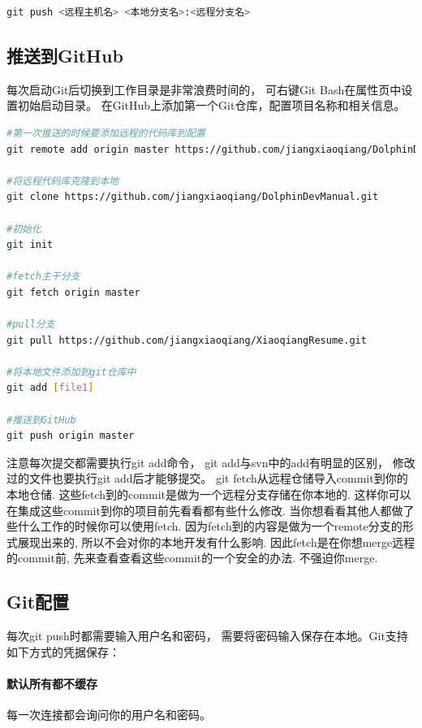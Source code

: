 \documentclass{book}
\begin{document}
\begin{lstlisting}[language=Bash]
git push <远程主机名> <本地分支名>:<远程分支名>
\end{lstlisting}

\subsection{推送到GitHub}

每次启动Git后切换到工作目录是非常浪费时间的，
可右键Git Bash在属性页中设置初始启动目录。
在GitHub上添加第一个Git仓库，配置项目名称和相关信息。

\begin{lstlisting}[language=Bash]
#第一次推送的时候要添加远程的代码库到配置
git remote add origin master https://github.com/jiangxiaoqiang/DolphinDevManual.git

#将远程代码库克隆到本地
git clone https://github.com/jiangxiaoqiang/DolphinDevManual.git

#初始化
git init

#fetch主干分支
git fetch origin master

#pull分支 
git pull https://github.com/jiangxiaoqiang/XiaoqiangResume.git

#将本地文件添加到git仓库中
git add [file1]

#推送到GitHub
git push origin master
\end{lstlisting}

注意每次提交都需要执行git add命令，
git add与svn中的add有明显的区别，
修改过的文件也要执行git add后才能够提交。
git fetch从远程仓储导入commit到你的本地仓储. 
这些fetch到的commit是做为一个远程分支存储在你本地的. 
这样你可以在集成这些commit到你的项目前先看看都有些什么修改.
当你想看看其他人都做了些什么工作的时候你可以使用fetch. 
因为fetch到的内容是做为一个remote分支的形式展现出来的, 
所以不会对你的本地开发有什么影响. 因此fetch是在你想merge远程的commit前, 
先来查看查看这些commit的一个安全的办法. 不强迫你merge.

\subsection{Git配置}

每次git push时都需要输入用户名和密码，
需要将密码输入保存在本地。Git支持如下方式的凭据保存：

\paragraph{默认所有都不缓存}每一次连接都会询问你的用户名和密码。
\end{document}
